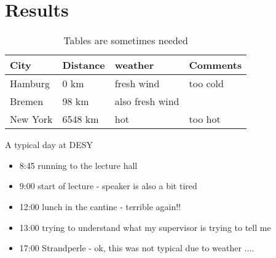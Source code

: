 \section{Results}
\label{sec:results}

\begin{table}[h]
\caption{ Tables are sometimes needed}
\begin{center}
\begin{tabular}{l|lll}
\hline
City & Distance & weather & Comments \\ 
\hline \hline
Hamburg & 0 km & fresh wind  & too cold\\ 
Bremen & 98 km & also fresh wind  & \\ 
New York & 6548 km & hot & too hot  \\ 
\hline 
\end{tabular}
\end{center}
\label{default}
\end{table}%



A typical day at DESY

\begin{itemize}
\item{8:45 running to the lecture hall }
\item{9:00 start of lecture - speaker is also a bit tired }
\item{12:00 lunch in the cantine - terrible again!! }
\item{13:00 trying to understand what my supervisor is trying to tell me}
\item{17:00 Strandperle - ok, this was not typical due to weather ....} 
\end{itemize}